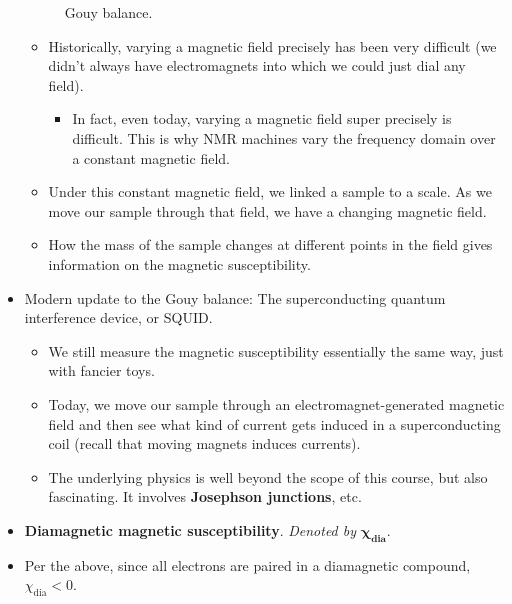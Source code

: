 \documentclass[../notes.tex]{subfiles}
\begin{document}
\begin{itemize}
\begin{figure}[h!]
        \caption{Gouy balance.}
        \label{fig:Gouy}
    \end{figure}
    \begin{itemize}
        \item Historically, varying a magnetic field precisely has been very difficult (we didn't always have electromagnets into which we could just dial any field).
        \begin{itemize}
            \item In fact, even today, varying a magnetic field super precisely is difficult. This is why NMR machines vary the frequency domain over a constant magnetic field.
        \end{itemize}
        \item Under this constant magnetic field, we linked a sample to a scale. As we move our sample through that field, we have a changing magnetic field.
        \item How the mass of the sample changes at different points in the field gives information on the magnetic susceptibility.
    \end{itemize}
    \item Modern update to the Gouy balance: The superconducting quantum interference device, or SQUID.
    \begin{itemize}
        \item We still measure the magnetic susceptibility essentially the same way, just with fancier toys.
        \item Today, we move our sample through an electromagnet-generated magnetic field and then see what kind of current gets induced in a superconducting coil (recall that moving magnets induces currents).
        \item The underlying physics is well beyond the scope of this course, but also fascinating. It involves \textbf{Josephson junctions}, etc.
    \end{itemize}
    \item \textbf{Diamagnetic magnetic susceptibility}. \emph{Denoted by} $\bm{\chi_\textbf{dia}}$.
    \item Per the above, since all electrons are paired in a diamagnetic compound, $\chi_\text{dia}<0$.

\end{itemize}
\end{document}
